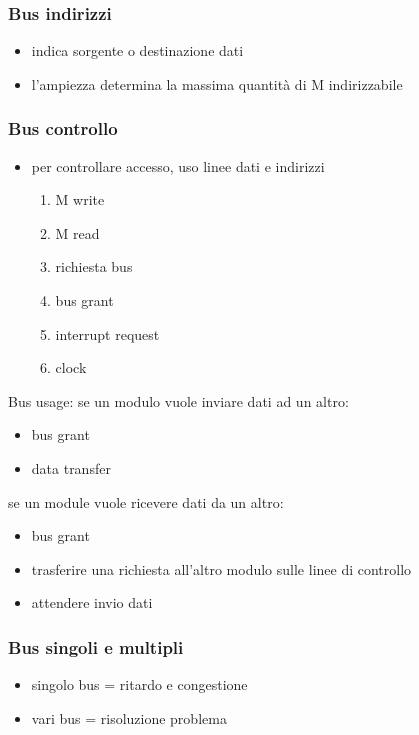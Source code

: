 \documentclass[12pt, a4paper]{article}
\begin{document}
\subsubsection{Bus indirizzi}
\begin{itemize}
	\item indica sorgente o destinazione dati
	\item l'ampiezza determina la massima quantità di M indirizzabile
\end{itemize}

\subsubsection{Bus controllo}
\begin{itemize}
	\item per controllare accesso, uso linee dati e indirizzi
	\begin{enumerate}
		\item M write
		\item M read
		\item richiesta bus
		\item bus grant
		\item interrupt request
		\item clock
	\end{enumerate}
\end{itemize}

Bus usage:
se un modulo vuole inviare dati ad un altro:
\begin{itemize}
	\item bus grant
	\item data transfer
\end{itemize}

se un module vuole ricevere dati da un altro:
\begin{itemize}
	\item bus grant
	\item trasferire una richiesta all'altro modulo sulle linee di controllo 
	\item attendere invio dati
\end{itemize}

\subsubsection{Bus singoli e multipli}
\begin{itemize}
	\item singolo bus = ritardo e congestione
	\item vari bus = risoluzione problema
\end{itemize}
\end{document}
